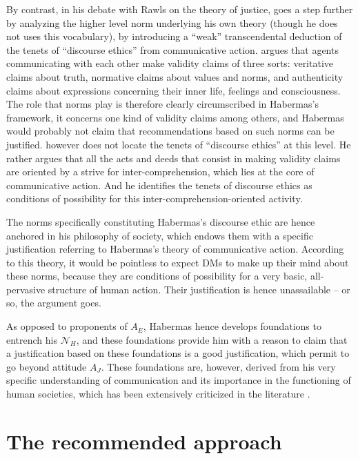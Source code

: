 \documentclass[preprint, french, english, 11pt, authoryear]{elsarticle}%
\begin{document}
By contrast, in his debate with Rawls on the theory of justice, \citet{habermas_moralbewustsein_1983} goes a step further by analyzing the higher level norm underlying his own theory (though he does not uses this vocabulary),
by introducing a “weak” transcendental deduction of the tenets of “discourse ethics” from communicative action. 
\citet{habermas_theorie_1981} argues that agents communicating with each other make validity claims of three sorts: veritative claims about truth, normative claims about values and norms, and authenticity claims about expressions concerning their inner life, feelings and consciousness. 
The role that norms play is therefore clearly circumscribed in Habermas's framework, it concerns one kind of validity claims among others, and Habermas would probably not claim that recommendations based on such norms can be justified. 
\cite{habermas_moralbewustsein_1983} however does not locate the tenets of “discourse ethics” at this level. 
He rather argues that all the acts and deeds that consist in making validity claims are oriented by a strive for inter-comprehension, which lies at the core of communicative action. And he identifies the tenets of discourse ethics as conditions of possibility for this inter-comprehension-oriented activity. 


The norms specifically constituting Habermas's discourse ethic are hence anchored in his philosophy of society, which endows them with a specific justification referring to Habermas's theory of communicative action.
According to this theory, it would be pointless to expect \acp{DM} to make up their mind about these norms, because 
they are conditions of possibility for a very basic, all-pervasive structure of human action. Their justification is hence unassailable -- or so, the argument goes.

As opposed to proponents of $A_E$, Habermas hence develops foundations to entrench his $\mathscr{N}_{H}$, and these foundations provide him with a reason to claim that a justification based on these foundations is a good justification, which permit to go beyond attitude $A_J$. 
These foundations are, however, derived from his very specific understanding of communication and its importance in the functioning of human societies, which has been extensively criticized in the literature \citep{heath_communicative_2001,honneth_kritik_1985,benhabib_situating_1992}. 


\section{The recommended approach}
\label{sec:recomm}
\end{document}
